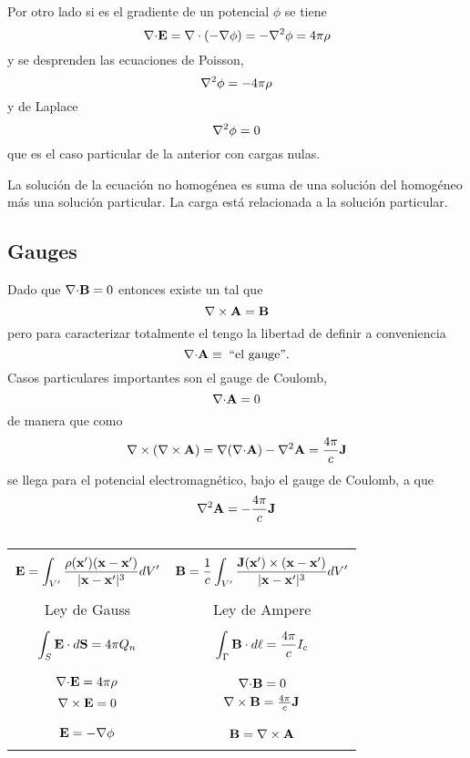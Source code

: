 \documentclass[10pt,oneside]{CBFT_book}
\begin{document}
Por otro lado si  es el gradiente de un potencial $\phi$ se tiene
\[
	\mathbf{\nabla}\mathbf{\cdot}\mathbf{E} = \mathbf{\nabla}\cdot{(-\mathbf{\nabla}\phi)} = - \nabla^2{\phi} = 4\pi \rho
\]
y se desprenden las ecuaciones de Poisson,
\[
	\nabla^2{\phi} = -4\pi \rho
\]
y de Laplace
\[
	\nabla^2{\phi} = 0
\]
que es el caso particular de la anterior con cargas nulas.

La solución de la ecuación no homogénea es suma de una solución del homogéneo más una solución
particular. La carga está relacionada a la solución particular.

\subsection{Gauges}

Dado que $\mathbf{\nabla}\mathbf{\cdot}\mathbf{B}=0$ entonces existe un  tal que 
\[
	\rotorm{A} = \vb{B}
\]
pero para caracterizar totalmente el  tengo la libertad de definir a conveniencia
\[
	\mathbf{\nabla}\mathbf{\cdot}\mathbf{A} \equiv \; \textrm{``el gauge''}.
\]
Casos particulares importantes son el gauge de Coulomb,
\[
	\mathbf{\nabla}\mathbf{\cdot}\mathbf{A} = 0
\]
de manera que como 
\[
	\Nabla \times (\rotorm{A}) = \Nabla(\divem{A}) - \lapm{\vb{A}} = \frac{4\pi}{c}\vb{J}
\]
se llega para el potencial electromagnético, bajo el gauge de Coulomb, a que 
\[
	\lapm{\vb{A}} = - \frac{4\pi}{c}\vb{J} 
\]

	\begin{table}[hbt]
	\centering
        \begin{tabular}{|c|c|}
		\hline
		& \\
		$\displaystyle{\vb{E} = \int_{V'} \frac{\rho(\vb{x}')(\vb{x}-\vb{x}')}{|\vb{x}-\vb{x}'|^3} dV' 
		}$ & $\displaystyle{\vb{B} = \frac{1}{c} \int_{V'} \frac{\vb{J}(\vb{x}') \times 
		(\vb{x}-\vb{x}')}{|\vb{x}-\vb{x}'|^3} dV'}$ \\
		& \\
		\hline
		Ley de Gauss & Ley de Ampere \\
		& \\
		$\displaystyle{\int_S \vb{E}\cdot d\vb{S} = 4\pi Q_n}$ &
		$\displaystyle{\int_\Gamma \vb{B}\cdot d\vb{\ell} = \frac{4\pi}{c} I_c}$ \\
		& \\
		\hline
		&\\
		$\mathbf{\nabla}\mathbf{\cdot}\mathbf{E} = 4\pi\rho$ & $\mathbf{\nabla}\mathbf{\cdot}\mathbf{B} = 0$ \\
		$\rotorm{E} = 0$ & $\rotorm{B} = \frac{4\pi}{c}\vb{J}$ \\
		& \\
		\hline
		& \\
		$\vb{E} = - \Nabla\phi$ & $\vb{B} = \rotorm{A}$ \\
		& \\
		\hline
        \end{tabular} 
	\caption{}
	\end{table} 
\end{document}
